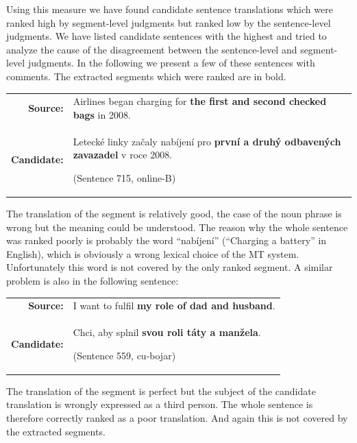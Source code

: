 Using this measure we have found candidate sentence translations which were
ranked high by segment-level judgments but ranked low by the sentence-level
judgments.  We have listed candidate sentences with the highest
 and tried to analyze the cause of the
disagreement between the sentence-level and segment-level judgments. In the
following we present a few of these sentences with comments. The extracted
segments which were ranked are in bold.

\begin{center}
  \begin{tabular}{rp{11cm}}

    \textbf{Source:} & Airlines began charging for \textbf{the first and second
  checked bags} in 2008. \\

    \textbf{Candidate:} & Letecké linky začaly nabíjení pro \textbf{první a
  druhý odbavených zavazadel} v roce 2008.
  
  (Sentence 715, online-B) \\

  \end{tabular}
\end{center}

\noindent The translation of the segment is relatively good, the case of the
noun phrase is wrong but the meaning could be understood. The reason why the
whole sentence was ranked poorly is probably the word ``nabíjení'' (``Charging
a battery'' in English), which is obviously a wrong lexical choice of the MT
system. Unfortunately this word is not covered by the only ranked segment. A
similar problem is also in the following sentence:

\begin{center}
  \begin{tabular}{rp{11cm}}

    \textbf{Source:} & I want to fulfil \textbf{my role of dad and husband}. \\

    \textbf{Candidate:} & Chci, aby splnil \textbf{svou roli táty a manžela}.
    
    (Sentence 559, cu-bojar) \\

  \end{tabular}
\end{center}

\noindent The translation of the segment is perfect but the subject of the
candidate translation is wrongly expressed as a third person. The whole
sentence is therefore correctly ranked as a poor translation. And again this is
not covered by the extracted segments.

